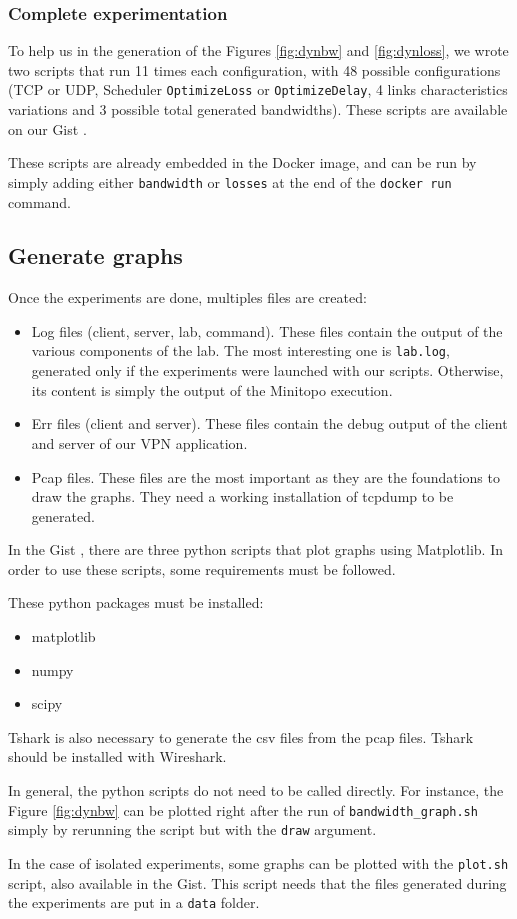 \subsubsection{Complete experimentation}

To help us in the generation of the Figures \ref{fig:dynbw} and \ref{fig:dynloss}, we wrote two scripts that run 11 times each configuration, with 48 possible configurations (TCP or UDP, Scheduler \texttt{OptimizeLoss} or \texttt{OptimizeDelay}, 4 links characteristics variations and 3 possible total generated bandwidths). These scripts are available on our Gist \cite{script-gist}.

These scripts are already embedded in the Docker image, and can be run by simply adding either \texttt{bandwidth} or \texttt{losses} at the end of the \texttt{docker run} command.

\subsection{Generate graphs}

Once the experiments are done, multiples files are created:

\begin{itemize}
\item Log files (client, server, lab, command). These files contain the output of the various components of the lab. The most interesting one is \texttt{lab.log}, generated only if the experiments were launched with our scripts. Otherwise, its content is simply the output of the Minitopo execution.
\item Err files (client and server). These files contain the debug output of the client and server of our VPN application.
\item Pcap files. These files are the most important as they are the foundations to draw the graphs. They need a working installation of tcpdump to be generated.
\end{itemize}

In the Gist \cite{script-gist}, there are three python scripts that plot graphs using Matplotlib. In order to use these scripts, some requirements must be followed.

These python packages must be installed:
\begin{itemize}
\item matplotlib
\item numpy
\item scipy
\end{itemize}

Tshark is also necessary to generate the csv files from the pcap files. Tshark should be installed with Wireshark.

In general, the python scripts do not need to be called directly. For instance, the Figure \ref{fig:dynbw} can be plotted right after the run of \texttt{bandwidth\_graph.sh} simply by rerunning the script but with the \texttt{draw} argument.

In the case of isolated experiments, some graphs can be plotted with the \texttt{plot.sh} script, also available in the Gist. This script needs that the files generated during the experiments are put in a \texttt{data} folder.